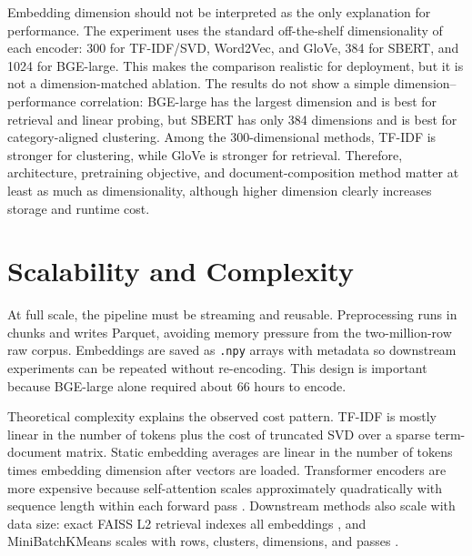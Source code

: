 \documentclass{article}
\newcommand{\code}[1]{\texttt{#1}}
\begin{document}
Embedding dimension should not be interpreted as the only explanation for performance. The experiment uses the standard off-the-shelf dimensionality of each encoder: 300 for TF-IDF/SVD, Word2Vec, and GloVe, 384 for SBERT, and 1024 for BGE-large. This makes the comparison realistic for deployment, but it is not a dimension-matched ablation. The results do not show a simple dimension--performance correlation: BGE-large has the largest dimension and is best for retrieval and linear probing, but SBERT has only 384 dimensions and is best for category-aligned clustering. Among the 300-dimensional methods, TF-IDF is stronger for clustering, while GloVe is stronger for retrieval. Therefore, architecture, pretraining objective, and document-composition method matter at least as much as dimensionality, although higher dimension clearly increases storage and runtime cost.

\section{Scalability and Complexity}
At full scale, the pipeline must be streaming and reusable. Preprocessing runs in chunks and writes Parquet, avoiding memory pressure from the two-million-row raw corpus. Embeddings are saved as \code{.npy} arrays with metadata so downstream experiments can be repeated without re-encoding. This design is important because BGE-large alone required about 66 hours to encode.

Theoretical complexity explains the observed cost pattern. TF-IDF is mostly linear in the number of tokens plus the cost of truncated SVD over a sparse term-document matrix. Static embedding averages are linear in the number of tokens times embedding dimension after vectors are loaded. Transformer encoders are more expensive because self-attention scales approximately quadratically with sequence length within each forward pass \cite{vaswani2017}. Downstream methods also scale with data size: exact FAISS L2 retrieval indexes all embeddings \cite{johnson2019}, and MiniBatchKMeans scales with rows, clusters, dimensions, and passes \cite{sculley2010}.
\end{document}
